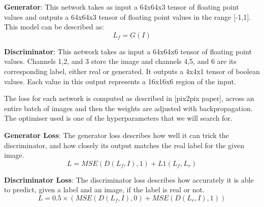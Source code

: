 \documentclass{UoYCSproject}
\begin{document}



\textbf{Generator}: This network takes as input a 64x64x3 tensor of floating point values and outputs a 64x64x3 tensor of floating point values in the range [-1,1]. This model can be described as: \[ L_{f} = G(I) \]

\textbf{Discriminator}: This network takes as input a 64x64x6 tensor of floating point values. Channels 1,2, and 3 store the image and channels 4,5, and 6 are its corresponding label, either real or generated. It outputs a 4x4x1 tensor of boolean values. Each value in this output represents a 16x16x6 region of the input.

The loss for each network is computed as described in [pix2pix paper], across an entire batch of images and then the weights are adjusted with backpropagation. The optimiser used is one of the hyperparameters that we will search for.

\textbf{Generator Loss}: The generator loss describes how well it can trick the discriminator, and how closely its output matches the real label for the given image.
\[ L = MSE( D(L_{f}, I), 1 ) + L1(L_{f}, L_{r}) \]

\textbf{Discriminator Loss}: The discriminator loss describes how accurately it is able to predict, given a label and an image, if the label is real or not.
\[ L = 0.5 \times  ( MSE( D( L_{f}, I ), 0) + MSE( D( L_{r}, I ), 1) ) \]
\end{document}
